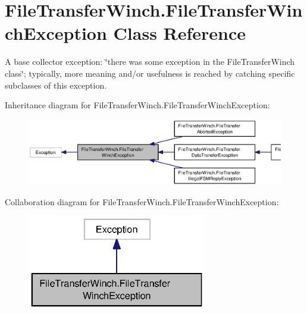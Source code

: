 \section{File\-Transfer\-Winch.\-File\-Transfer\-Winch\-Exception Class Reference}
\label{classorg_1_1smallfoot_1_1filexfer_1_1FileTransferWinch_1_1FileTransferWinchException}


A base collector exception\-: \char`\"{}there was some exception in the File\-Transfer\-Winch class\char`\"{}; typically, more meaning and/or usefulness is reached by catching specific subclasses of this exception.  




Inheritance diagram for File\-Transfer\-Winch.\-File\-Transfer\-Winch\-Exception\-:\nopagebreak
\begin{figure}[H]
\begin{center}
\leavevmode
\includegraphics[width=350pt]{classorg_1_1smallfoot_1_1filexfer_1_1FileTransferWinch_1_1FileTransferWinchException__inherit__graph}
\end{center}
\end{figure}


Collaboration diagram for File\-Transfer\-Winch.\-File\-Transfer\-Winch\-Exception\-:\nopagebreak
\begin{figure}[H]
\begin{center}
\leavevmode
\includegraphics[width=222pt]{classorg_1_1smallfoot_1_1filexfer_1_1FileTransferWinch_1_1FileTransferWinchException__coll__graph}
\end{center}
\end{figure}
